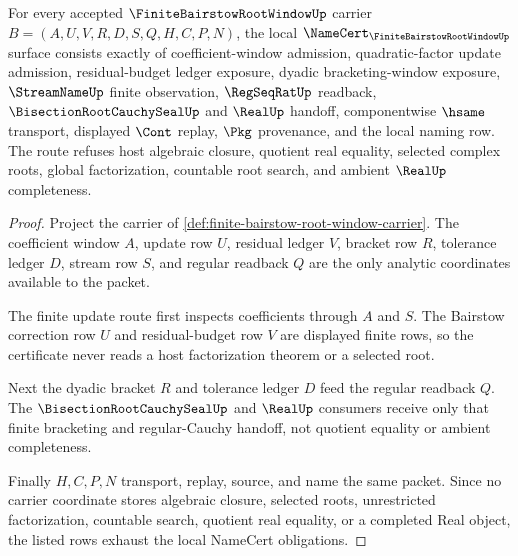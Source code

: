 \begin{theorem}
\label{thm:finite-bairstow-root-window-namecert-obligations}
For every accepted $\FiniteBairstowRootWindowUp$ carrier $B=(A,U,V,R,D,S,Q,H,C,P,N)$, the local $\NameCert_{\FiniteBairstowRootWindowUp}$ surface consists exactly of coefficient-window admission, quadratic-factor update admission, residual-budget ledger exposure, dyadic bracketing-window exposure, $\StreamNameUp$ finite observation, $\RegSeqRatUp$ readback, $\BisectionRootCauchySealUp$ and $\RealUp$ handoff, componentwise $\hsame$ transport, displayed $\Cont$ replay, $\Pkg$ provenance, and the local naming row. The route refuses host algebraic closure, quotient real equality, selected complex roots, global factorization, countable root search, and ambient $\RealUp$ completeness.
\end{theorem}
\begin{proof}
Project the carrier of \autoref{def:finite-bairstow-root-window-carrier}. The coefficient window $A$, update row $U$, residual ledger $V$, bracket row $R$, tolerance ledger $D$, stream row $S$, and regular readback $Q$ are the only analytic coordinates available to the packet.

The finite update route first inspects coefficients through $A$ and $S$. The Bairstow correction row $U$ and residual-budget row $V$ are displayed finite rows, so the certificate never reads a host factorization theorem or a selected root.

Next the dyadic bracket $R$ and tolerance ledger $D$ feed the regular readback $Q$. The $\BisectionRootCauchySealUp$ and $\RealUp$ consumers receive only that finite bracketing and regular-Cauchy handoff, not quotient equality or ambient completeness.

Finally $H,C,P,N$ transport, replay, source, and name the same packet. Since no carrier coordinate stores algebraic closure, selected roots, unrestricted factorization, countable search, quotient real equality, or a completed Real object, the listed rows exhaust the local NameCert obligations.
\end{proof}


